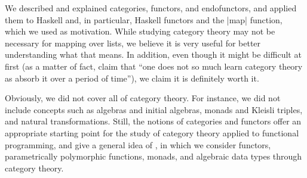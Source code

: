\documentclass[11pt,letterpaper]{article}
\theoremstyle{definition}
\begin{document}
We described and explained categories, functors, and endofunctors, and
applied them to Haskell and, in particular, Haskell functors and the
|map| function, which we used as motivation. While studying category
theory may not be necessary for mapping over lists, we believe it is
very useful for better understanding what that means. In addition,
even though it might be difficult at first (as a matter of fact,
\textcite[25]{bird-demoor-1997} claim that ``one does not so much
learn category theory as absorb it over a period of time''), we claim
it is definitely worth it.

Obviously, we did not cover all of category theory. For instance, we
did not include concepts such as algebras and initial algebras, monads
and Kleisli triples, and natural transformations. Still, the notions
of categories and functors offer an appropriate starting point for the
study of category theory applied to functional programming, and give a
general idea of \parencite{villaisaza-2014}, in which we consider
functors, parametrically polymorphic functions, monads, and algebraic
data types through category theory.


\printbibliography

\end{document}
